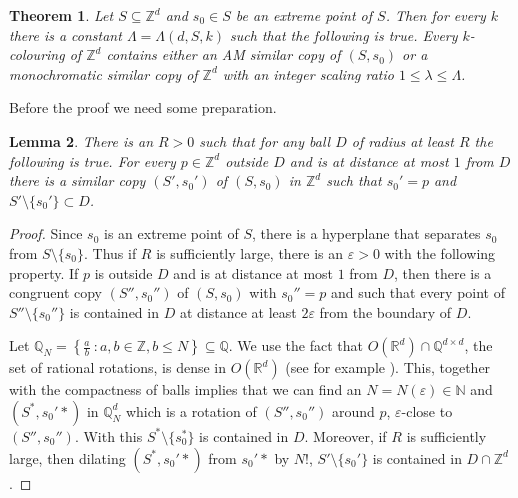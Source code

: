 \documentclass[12pt]{article}
\newcommand{\setbuilder}[2]{\left\{#1\ \colon #2\right\}}
\newcommand{\Z}{{\mathbb Z}}
\theoremstyle{plain}
\newtheorem{theorem}{Theorem}
\newtheorem{lemma}[theorem]{Lemma}
\theoremstyle{definition}
\begin{document}
\begin{theorem}\label{grid} Let $S\subseteq \mathbb{Z}^d$ and $s_0\in S$ be an extreme point of $S$. Then for every $k$ there is a constant $\Lambda=\Lambda(d,S,k)$ such that the following is true. Every $k$-colouring of $\mathbb{Z}^d$ contains either an AM similar copy of $(S,s_0)$ or a monochromatic similar copy of $\Z^d$ with an integer scaling ratio $1\leq \lambda \leq \Lambda$.
\end{theorem}

Before the proof we need some preparation.


\begin{lemma}\label{lemextension}
	 There is an $R>0$ such that for any ball $D$ of radius at least $R$ the following is true. For every $p\in \Z^d$ outside $D$ and is at distance at most $1$ from $D$ there is a similar copy $(S',s_0')$ of $(S,s_0)$ in $\mathbb{Z}^d$ such that $s_0'=p$ and $S'\setminus \{s_0'\}\subset D$.
\end{lemma}




\begin{proof}Since $s_0$ is an extreme point of $S$, there is a hyperplane that separates $s_0$ from $S\setminus\{s_0\}$. Thus if $R$ is sufficiently large, there is an $\varepsilon>0$ with the following property. If $p$ is outside $D$ and is at distance at most $1$ from $D$, then there is a congruent copy $(S'',s_0'')$ of $(S,s_0)$ with $s_0''=p$ and such that every point of $S''\setminus \{s_0''\}$ is contained in $D$ at distance at least $2\varepsilon$ from the boundary of $D$. 

Let $\mathbb{Q}_N=\setbuilder{\frac{a}{b}}{a,b\in \mathbb{Z}, b\leq N}\subseteq \mathbb{Q}$. We use the fact that $O(\mathbb{R}^d)\cap \mathbb{Q}^{d\times d}$, the set of rational rotations, is dense in $O(\mathbb{R}^d)$ (see for example \cite{dense}). This, together with the compactness of balls implies that we can find an $N=N(\varepsilon)\in \mathbb{N}$ and $(S^*,s_0'*)$ in $\mathbb{Q}_N^d$ which is a rotation of $(S'',s_0'')$ around $p$, $\varepsilon$-close to $(S'',s_0'')$.  With this $S^*\setminus \{s_0^*\}$ is contained in $D$. Moreover, if $R$ is sufficiently large, then dilating $(S^*,s_0'*)$ from $s_0'*$ by $N!$, $S'\setminus \{s_0'\}$ is contained in $D\cap \mathbb{Z}^d$.
\end{proof}
\end{document}
